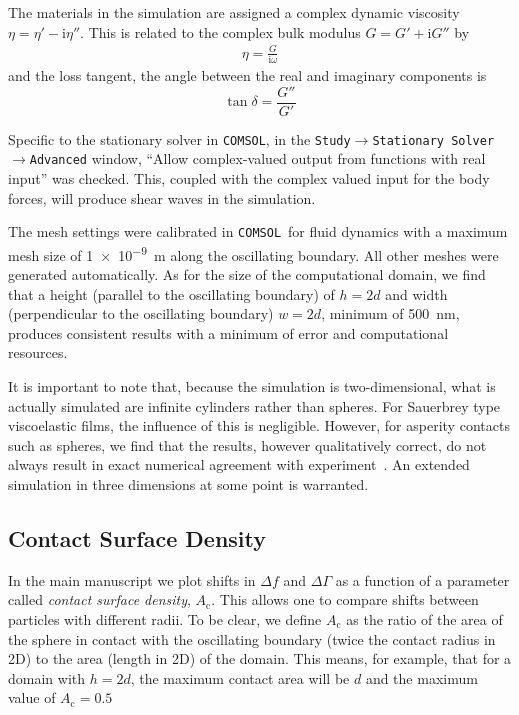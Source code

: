 \documentclass[floatfix,superscriptaddress,a4paper,notitlepage]{revtex4-1}
\newcommand{\mi}{{\mathrm{i}}}
\newcommand{\comsol}{\texttt{COMSOL}}
\newcommand{\df}{\Delta\!f}
\newcommand{\dg}{\Delta\Gamma}
\newcommand{\Ac}{A_\mathrm{c}}
\begin{document}
The materials in the simulation are assigned a complex dynamic viscosity
$\eta = \eta'-\mi\eta''$.  This is related to the complex bulk modulus
$G=G'+\mi G''$ by
\begin{align}
 \eta = \frac{G}{\mi \omega}
\end{align}
and the loss tangent, the angle between the real and imaginary components
is 
\begin{equation}
 \tan \delta = \frac{G''}{G'}
\end{equation}

Specific to the stationary solver in \comsol, in the
\texttt{Study$\rightarrow$Stationary Solver$\rightarrow$Advanced} window,
``Allow complex-valued output from functions with real input'' was checked.
This, coupled with the complex valued input for the body forces, will
produce shear waves in the simulation.

The mesh settings were calibrated in \comsol~for fluid dynamics with a
maximum mesh size of \SI{1e-9}{\meter} along the oscillating boundary.  All
other meshes were generated automatically.  As for the size of the
computational domain, we find that a height (parallel to the oscillating
boundary) of $h=2d$ and width (perpendicular to the oscillating boundary)  
$w=2d$, minimum of \SI{500}{\nano\meter}, produces consistent results with a
minimum of error and computational resources.

It is important to note that, because the simulation is two-dimensional,
what is actually simulated are infinite cylinders rather than spheres.  For
Sauerbrey type viscoelastic films, the influence of this is negligible.
However, for asperity contacts such as spheres, we find that the results,
however qualitatively correct, do not always result in exact numerical
agreement with experiment~\cite{Vittorias2010489}.  An extended simulation
in three dimensions at some point is warranted.

\subsection{Contact Surface Density}

In the main manuscript we plot shifts in $\df$ and $\dg$ as a function of a
parameter called \textit{contact surface density}, $\Ac$.  This allows one
to compare shifts between particles with different radii.  To be clear, we
define $\Ac$ as the ratio of the area of the sphere in contact with the
oscillating boundary (twice the contact radius in 2D) to the area (length
in 2D) of the domain.  This means, for example, that for a domain with
$h=2d$, the maximum contact area will be $d$ and the maximum value of
$\Ac=0.5$
\end{document}
